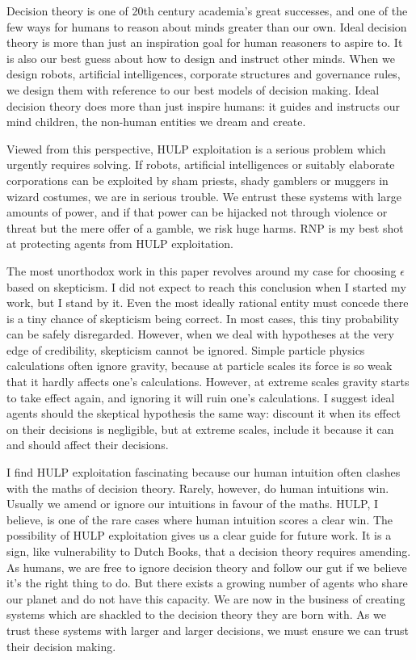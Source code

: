 \documentclass{article}
\begin{document}
Decision theory is one of 20th century academia's great successes, and one of the few ways for humans to reason about minds greater than our own. Ideal decision theory is more than just an inspiration goal for human reasoners to aspire to. It is also our best guess about how to design and instruct other minds. When we design robots, artificial intelligences, corporate structures and governance rules, we design them with reference to our best models of decision making. Ideal decision theory does more than just inspire humans: it guides and instructs our mind children, the non-human entities we dream and create. 

Viewed from this perspective, HULP exploitation is a serious problem which urgently requires solving. If robots, artificial intelligences or suitably elaborate corporations can be exploited by sham priests, shady gamblers or muggers in wizard costumes, we are in serious trouble. We entrust these systems with large amounts of power, and if that power can be hijacked not through violence or threat but the mere offer of a gamble, we risk huge harms. RNP is my best shot at protecting agents from HULP exploitation.

The most unorthodox work in this paper revolves around my case for choosing \(\epsilon\) based on skepticism. I did not expect to reach this conclusion when I started my work, but I stand by it. Even the most ideally rational entity must concede there is a tiny chance of skepticism being correct. In most cases, this tiny probability can be safely disregarded. However, when we deal with hypotheses at the very edge of credibility, skepticism cannot be ignored. Simple particle physics calculations often ignore gravity, because at particle scales its force is so weak that it hardly affects one's calculations. However, at extreme scales gravity starts to take effect again, and ignoring it will ruin one's calculations. I suggest ideal agents should the skeptical hypothesis the same way: discount it when its effect on their decisions is negligible, but at extreme scales, include it because it can and should affect their decisions.

I find HULP exploitation fascinating because our human intuition often clashes with the maths of decision theory. Rarely, however, do human intuitions win. Usually we amend or ignore our intuitions in favour of the maths. HULP, I believe, is one of the rare cases where human intuition scores a clear win. The possibility of HULP exploitation gives us a clear guide for future work. It is a sign, like vulnerability to Dutch Books, that a decision theory requires amending. As humans, we are free to ignore decision theory and follow our gut if we believe it's the right thing to do. But there exists a growing number of agents who share our planet and do not have this capacity. We are now in the business of creating systems which are shackled to the decision theory they are born with. As we trust these systems with larger and larger decisions, we must ensure we can trust their decision making.




\end{document}
